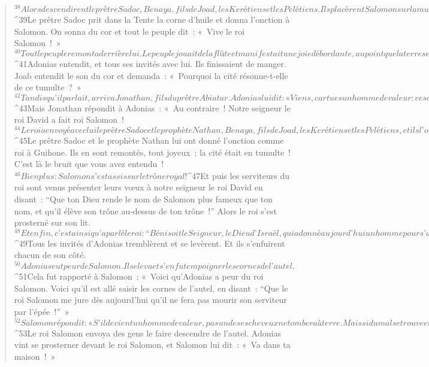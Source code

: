 \begin{verse}
${}^{38}Alors descendirent le prêtre Sadoc, Benaya, fils de Joad, les Kerétiens et les Pelétiens. Ils placèrent Salomon sur la mule du roi et le conduisirent à Guihone. 
${}^{39}Le prêtre Sadoc prit dans la Tente la corne d’huile et donna l’onction à Salomon. On sonna du cor et tout le peuple dit : « Vive le roi Salomon ! » 
${}^{40}Tout le peuple remonta derrière lui. Le peuple jouait de la flûte et manifestait une joie débordante, au point que la terre se fendait à leurs voix.
${}^{41}Adonias entendit, et tous ses invités avec lui. Ils finissaient de manger. Joab entendit le son du cor et demanda : « Pourquoi la cité résonne-t-elle de ce tumulte ? » 
${}^{42}Tandis qu’il parlait, arriva Jonathan, fils du prêtre Abiatar. Adonias lui dit : « Viens, car tu es un homme de valeur : ce sont de bonnes nouvelles que tu apportes ! » 
${}^{43}Mais Jonathan répondit à Adonias : « Au contraire ! Notre seigneur le roi David a fait roi Salomon ! 
${}^{44}Le roi a envoyé avec lui le prêtre Sadoc et le prophète Nathan, Benaya, fils de Joad, les Kerétiens et les Pelétiens, et ils l’ont placé sur la mule du roi. 
${}^{45}Le prêtre Sadoc et le prophète Nathan lui ont donné l’onction comme roi à Guihone. Ils en sont remontés, tout joyeux ; la cité était en tumulte ! C’est là le bruit que vous avez entendu ! 
${}^{46}Bien plus : Salomon s’est assis sur le trône royal ! 
${}^{47}Et puis les serviteurs du roi sont venus présenter leurs vœux à notre seigneur le roi David en disant : “Que ton Dieu rende le nom de Salomon plus fameux que ton nom, et qu’il élève son trône au-dessus de ton trône !” Alors le roi s’est prosterné sur son lit. 
${}^{48}Et enfin, c’est ainsi qu’a parlé le roi : “Béni soit le Seigneur, le Dieu d’Israël, qui a donné aujourd’hui un homme pour s’asseoir sur mon trône, et qui a donné à mes yeux de le voir !” »
${}^{49}Tous les invités d’Adonias tremblèrent et se levèrent. Et ils s’enfuirent chacun de son côté. 
${}^{50}Adonias eut peur de Salomon. Il se leva et s’en fut empoigner les cornes de l’autel. 
${}^{51}Cela fut rapporté à Salomon : « Voici qu’Adonias a peur du roi Salomon. Voici qu’il est allé saisir les cornes de l’autel, en disant : “Que le roi Salomon me jure dès aujourd’hui qu’il ne fera pas mourir son serviteur par l’épée !” » 
${}^{52}Salomon répondit : « S’il devient un homme de valeur, pas un de ses cheveux ne tombera à terre. Mais si du mal se trouve en lui, il mourra ! » 
${}^{53}Le roi Salomon envoya des gens le faire descendre de l’autel. Adonias vint se prosterner devant le roi Salomon, et Salomon lui dit : « Va dans ta maison ! »
      

\end{verse}
